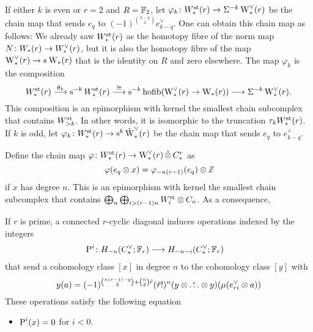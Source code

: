 If either $k$ is even or $r=2$ and $R=\bF_2$, let $\varphi_k \colon \Wst(r) \to \susp{-k}\rWd(r)$ be the chain map that sends $e_q$ to $(-1)^{\binom{k-q}{2}}e_{k-q}^{\vee}$.
One can obtain this chain map as follows: We already saw $\Wst(r)$ as the homotopy fibre of the norm map $N \colon \W(r) \to \Wd(r)$, but it is also the homotopy fibre of the map $\rWd(r) \to \sus{}\rW(r)$ that is the identity on $R$ and zero elsewhere.
The map $\varphi_k$ is the composition
\[
\Wst(r)\overset{\theta_k}{\lra} \sus{-k} \Wst(r) \overset{\cong}{\lra} \sus{-k}\hofib(\rWd(r) \to \rW(r)) \lra \susp{-k}\rWd(r).
\]
This composition is an epimorphism with kernel the smallest chain subcomplex that contains $\Wst[>k]$.
In other words, it is isomorphic to the truncation $\tau_k \Wst(r)$.
If $k$ is odd, let $\varphi_k \colon \Wst(r) \to \sus{k}\rWhatd(r)$ be the chain map that sends $e_q$ to $e_{k-q}^{\vee}$.

Define the chain map $\varphi \colon \Wst(r) \to \rWd(r) \hotimes \rucadenas$ as
\[
\varphi(e_q \ot x) = \varphi_{-n(r-1)}(e_{q}) \ot \vec{x}
\]
if $x$ has degree $n$.
This is an epimorphism with kernel the smallest chain subcomplex that contains $\bigoplus_n\bigoplus_{i>(r-1)n} \Wst[i] \ot \ucadenas[n]$.
As a consequence,

\begin{proposition}
	If $r$ is prime, a connected $r$-cyclic diagonal induces operations indexed by the integers
	\begin{align*}
		\power^{i} \colon H_{-n}(\ucocadenas;\mathbb{F}_r)& \lra H_{-n-i}(\ucocadenas;\mathbb{F}_r)
	\end{align*}
	that send a cohomology class $[x]$ in degree $n$ to the cohomology class $[y]$ with
	\[
	y(a) = (-1)^{\binom{n(r-1)-q}{2} + \binom{n}{2}\tilde{r}}(\tilde{r}!)^n(y \ot \overset{r}{\dots} \ot y)(\mu(e_{ri}^\vee \ot a))
	\]
	These operations satisfy the following equation
	\begin{itemize}
		\item $\power^i(x) = 0$ for $i<0$.
	\end{itemize}
\end{proposition}

